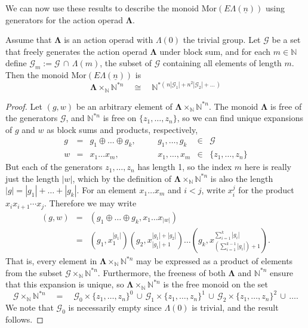 \documentclass{amsbook} %
\newcommand{\ML}{\mathbf{\Lambda}}
\newcommand{\LL}{\Lambda}
\newcommand{\ELn}{E\Lambda(\underline{n})}
\numberwithin{section}{chapter}
\begin{document}

We can now use these results to describe the monoid $\mathrm{Mor}(\ELn)$ using generators for the action operad $\ML$.

\begin{prop} \label{freemor} Assume that $\ML$ is an action operad with $\LL(0)$ the trivial group. Let $\mathcal{G}$ be a set that freely generates the action operad $\ML$ under block sum, and for each $m \in \mathbb{N}$ define $\mathcal{G}_m := \mathcal{G} \, \cap \,  \Lambda(m)$, the subset of $\mathcal{G}$ containing all elements of length $m$. Then the monoid $\mathrm{Mor}(\ELn)$ is 
\[ \ML \times_{\mathbb{N}} \mathbb{N}^{\ast n} \quad \cong \quad \mathbb{N}^{\ast ( \, n|\mathcal{G}_1| + n^2 |\mathcal{G}_2| + \ldots \, )} \]
\end{prop}
\begin{proof}
Let $(g, w)$ be an arbitrary element of $\ML \times_{\mathbb{N}} \mathbb{N}^{\ast n}$. The monoid $\ML$ is free of the generators $\mathcal{G}$, and $\mathbb{N}^{\ast n}$ is free on $\{z_1, \ldots, z_n\}$, so we can find unique expansions of $g$ and $w$ as block sums and products, respectively,
\[ \begin{array}{rclcrcl}
			g & = & g_1 \oplus \ldots \oplus g_k, & \quad & g_1, \ldots, g_k & \in & \mathcal{G} \\
			w & = & x_1  \ldots x_m, & \quad & x_1, \ldots, x_m & \in & \{z_1, \ldots, z_n\}
		\end{array}
\]
But each of the generators $z_1, \ldots, z_n$ has length 1, so the index $m$ here is really just the length $|w|$, which by the definition of $\ML \times_{\mathbb{N}} \mathbb{N}^{\ast n}$ is also the length $|g| = |g_1| + \ldots + |g_k|$. For an element $x_1  \ldots x_m$ and $i < j$, write $x_i^j$ for the product $x_i x_{i+1} \cdots x_j$. Therefore we may write
\[ \begin{array}{rll}
			(g, w) & = & (g_1 \oplus \ldots \oplus g_k, x_1  \ldots  x_{|w|}) \\
			& = & (g_1, x_1^{|g_1|})  (g_2, x_{|g_1|+1}^{|g_1|+|g_2|})  \ldots  (g_k, x_{(\sum_{i=1}^{k-1}|g_i| )+1}^{\sum_{i=1}^{k}|g_i| }).
		\end{array}
\]
That is, every element in $\ML \times_{\mathbb{N}} \mathbb{N}^{\ast n}$ may be expressed as a product of elements from the subset $\mathcal{G} \times_{\mathbb{N}} \mathbb{N}^{\ast n}$. Furthermore, the freeness of both $\ML$ and $\mathbb{N}^{\ast n}$ ensure that this expansion is unique, so $\ML \times_{\mathbb{N}} \mathbb{N}^{\ast n}$ is the free monoid on the set 
\[ \mathcal{G} \times_{\mathbb{N}} \mathbb{N}^{\ast n} \quad = \quad \mathcal{G}_0 \times \{ z_1, \ldots, z_n \}^0  \, \cup \, \mathcal{G}_1 \times \{ z_1, \ldots, z_n \}^1 \, \cup \, \mathcal{G}_2 \times \{ z_1, \ldots, z_n \}^2 \, \cup \, \ldots.\]
We note that $\mathcal{G}_0$ is necessarily empty since $\LL(0)$ is trivial, and the result follows.
\end{proof}
\end{document}
